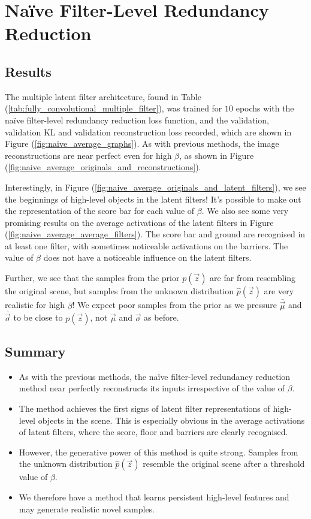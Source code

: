\clearpage
%
%
%
%
%
\section{Na{\"i}ve Filter-Level Redundancy Reduction}

\subsection{Results}
The multiple latent filter architecture, found in Table (\ref{tab:fully_convolutional_multiple_filter}), was trained for $10$ epochs with the na{\"i}ve filter-level redundancy reduction loss function, and the validation, validation KL and validation reconstruction loss recorded, which are shown in Figure (\ref{fig:naive_average_graphs}). As with previous methods, the image reconstructions are near perfect even for high $\beta$, as shown in Figure (\ref{fig:naive_average_originals_and_reconstructions}). 

Interestingly, in Figure (\ref{fig:naive_average_originals_and_latent_filters}), we see the beginnings of high-level objects in the latent filters! It's possible to make out the representation of the score bar for each value of $\beta$. We also see some very promising results on the average activations of the latent filters in Figure (\ref{fig:naive_average_average_filters}). The score bar and ground are recognised in at least one filter, with sometimes noticeable activations on the barriers. The value of $\beta$ does not have a noticeable influence on the latent filters. 

Further, we see that the samples from the prior $p(\vec{z})$ are far from resembling the original scene, but samples from the unknown distribution $\hat{p}(\vec{z})$ are very realistic for high $\beta$! We expect poor samples from the prior as we pressure $\bar{\vec{\mu}}$ and $\bar{\vec{\sigma}}$ to be close to $p(\vec{z})$, not $\vec{\mu}$ and $\vec{\sigma}$ as before.

\subsection{Summary}
\begin{itemize}
\item As with the previous methods, the na{\"i}ve filter-level redundancy reduction method near perfectly reconstructs its inputs irrespective of the value of $\beta$.
\item The method achieves the first signs of latent filter representations of high-level objects in the scene. This is especially obvious in the average activations of latent filters, where the score, floor and barriers are clearly recognised.
\item However, the generative power of this method is quite strong. Samples from the unknown distribution $\hat{p}(\vec{z})$ resemble the original scene after a threshold value of $\beta$.
\item We therefore have a method that learns persistent high-level features and may generate realistic novel samples.
\end{itemize}


